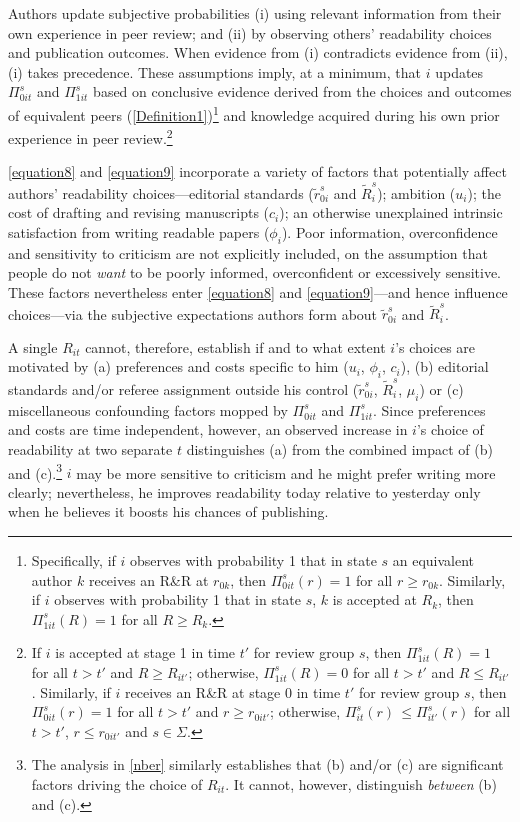 Authors update subjective probabilities (i) using relevant information from their own experience in peer review; and (ii) by observing others' readability choices and publication outcomes. When evidence from (i) contradicts evidence from (ii), (i) takes precedence. These assumptions imply, at a minimum, that $i$ updates $\Pi_{0it}^s$ and $\Pi_{1it}^s$ based on conclusive evidence derived from the choices and outcomes of equivalent peers (\autoref{Definition1})\footnote{\label{Footnote64}Specifically, if $i$ observes with probability 1 that in state $s$ an equivalent author $k$ receives an R\&R at $r_{0k}$, then $\Pi_{0it}^s(r)=1$ for all $r\ge r_{0k}$. Similarly, if $i$ observes with probability 1 that in state $s$, $k$ is accepted at $R_k$, then $\Pi_{1it}^s(R)=1$ for all $R\ge R_k$.} and knowledge acquired during his own prior experience in peer review.\footnote{\label{Footnote70}If $i$ is accepted at stage 1 in time $t'$ for review group $s$, then $\Pi_{1it}^s(R)=1$ for all $t>t'$ and $R\ge R_{it'}$; otherwise, $\Pi_{1it}^s(R)=0$ for all $t>t'$ and $R\le R_{it'}$. Similarly, if $i$ receives an R\&R at stage 0 in time $t'$ for review group $s$, then $\Pi_{0it}^s(r)=1$ for all $t>t'$ and $r\ge r_{0it'}$; otherwise, $\Pi_{it}^s(r)\,\le\Pi_{it'}^s(r)$ for all $t>t'$, $r\le r_{0it'}$ and $s\in\Sigma$.}



\autoref{equation8} and \autoref{equation9} incorporate a variety of factors that potentially affect authors' readability choices---editorial standards ($\widetilde r_{0i}^s$ and $\widetilde R_i^s$); ambition ($u_i$); the cost of drafting and revising manuscripts ($c_i$); an otherwise unexplained intrinsic satisfaction from writing readable papers ($\phi_i$). Poor information, overconfidence and sensitivity to criticism are not explicitly included, on the assumption that people do not \emph{want} to be poorly informed, overconfident or excessively sensitive. These factors nevertheless enter \autoref{equation8} and \autoref{equation9}---and hence influence choices---via the subjective expectations authors form about $\widetilde r_{0i}^s$ and $\widetilde R_i^s$.

A single $R_{it}$ cannot, therefore, establish if and to what extent $i$'s choices are motivated by (a) preferences and costs specific to him ($u_i$, $\phi_i$, $c_i$), (b) editorial standards and\slash or referee assignment outside his control ($\widetilde r_{0i}^s$, $\widetilde R_i^s$, $\mu_i$) or (c) miscellaneous confounding factors mopped by $\Pi_{0it}^s$ and $\Pi_{1it}^s$. Since preferences and costs are time independent, however, an observed increase in $i$'s choice of readability at two separate $t$ distinguishes (a) from the combined impact of (b) and (c).\footnote{The analysis in \autoref{nber} similarly establishes that (b) and\slash or (c) are significant factors driving the choice of $R_{it}$. It cannot, however, distinguish \emph{between} (b) and (c).} $i$ may be more sensitive to criticism and he might prefer writing more clearly; nevertheless, he improves readability today relative to yesterday only when he believes it boosts his chances of publishing.

